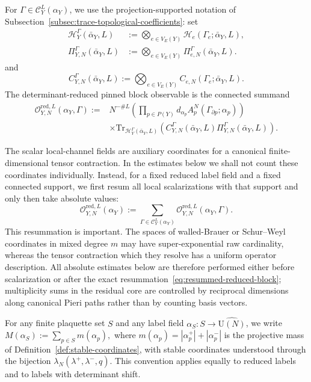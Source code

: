 \documentclass[11pt,a4paper,reqno]{amsart}
\theoremstyle{definition}
\theoremstyle{remark}
\newcommand\U{{\mathrm U}}
\newcommand\Tr{{\mathrm{Tr}}}
\begin{document}
For $\Gamma\in\mathcal C_Y^L(\alpha_Y)$, we use the projection-supported notation of Subsection~\ref{subsec:trace-topological-coefficients}: set
\[
\begin{aligned}
\mathcal H_Y^\Gamma(\bar\alpha_Y,L)
&:=\bigotimes_{e\in V_E(Y)}\mathcal H_e(\Gamma_e;\bar\alpha_Y,L),\\
\Pi^\Gamma_{Y,N}(\bar\alpha_Y,L)
&:=\bigotimes_{e\in V_E(Y)}\Pi^\Gamma_{e,N}(\bar\alpha_Y,L).
\end{aligned}
\]
and
\[
C_{Y,N}^\Gamma(\bar\alpha_Y,L):=\bigotimes_{e\in V_E(Y)}C_{e,N}(\Gamma_e;\bar\alpha_Y,L).
\]
The determinant-reduced pinned block observable is the connected summand
\begin{equation}\label{eq:scalarization-of-block}
\begin{aligned}
\mathcal O_{Y,N}^{\mathrm{red},L}(\alpha_Y,\Gamma)
:={}&N^{-\#L}
\left(\prod_{p\in P(Y)}d_{\alpha_p}A_p^N(\Gamma_{\partial p};\alpha_p)\right)\\
&\times
\Tr_{\mathcal H_Y^\Gamma(\bar\alpha_Y,L)}\left(
C_{Y,N}^\Gamma(\bar\alpha_Y,L)
\Pi^\Gamma_{Y,N}(\bar\alpha_Y,L)
\right).
\end{aligned}
\end{equation}

The scalar local-channel fields are auxiliary coordinates for a canonical finite-dimensional tensor contraction.  In the estimates below we shall not count these coordinates individually.  Instead, for a fixed reduced label field and a fixed connected support, we first resum all local scalarizations with that support and only then take absolute values:
\begin{equation}\label{eq:resummed-reduced-block}
\mathcal O_{Y,N}^{\mathrm{red},L}(\alpha_Y)
:=
\sum_{\Gamma\in\mathcal C_Y^L(\alpha_Y)}
\mathcal O_{Y,N}^{\mathrm{red},L}(\alpha_Y,\Gamma).
\end{equation}
This resummation is important.  The spaces of walled-Brauer or Schur--Weyl coordinates in mixed degree $m$ may have super-exponential raw cardinality, whereas the tensor contraction which they resolve has a uniform operator description.  All absolute estimates below are therefore performed either before scalarization or after the exact resummation~\eqref{eq:resummed-reduced-block}; multiplicity sums in the residual core are controlled by reciprocal dimensions along canonical Pieri paths rather than by counting basis vectors.

For any finite plaquette set $S$ and any label field $\alpha_S:S\to\widehat{\U(N)}$, we write $M(\alpha_S):=\sum_{p\in S}m(\alpha_p),$ where $m(\alpha_p)=|\alpha_p^+|+|\alpha_p^-|$ is the projective mass of Definition~\ref{def:stable-coordinates}, with stable coordinates understood through the bijection $\lambda_N(\lambda^+,\lambda^-,q)$.  This convention applies equally to reduced labels and to labels with determinant shift.
\end{document}
